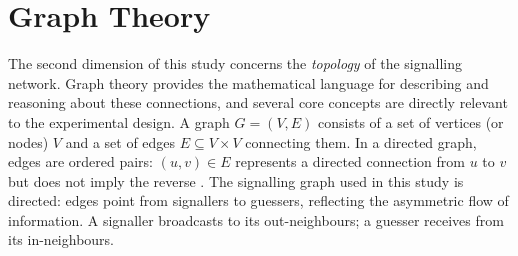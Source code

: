 \documentclass[a4paper,twoside,12pt]{report}
\begin{document}
    
    
    
    
    \section*{Graph Theory}
    \label{sec:grpahs}
    The second dimension of this study concerns the \emph{topology} of the
    signalling network. Graph theory provides the mathematical language for describing and
    reasoning about these connections, and several core concepts are directly
    relevant to the experimental design. A graph $G = (V, E)$ consists of a set of vertices (or nodes)
    $V$ and a set of edges $E \subseteq V \times V$ connecting them. In a directed graph, edges are
    ordered pairs: $(u,v) \in E$ represents a directed connection from $u$ to $v$
    but does not imply the reverse \citep{diestel2017}. The signalling graph used
    in this study is directed: edges point from signallers to guessers, reflecting
    the asymmetric flow of information. A signaller broadcasts to its out-neighbours;
    a guesser receives from its in-neighbours.
     
\end{document}
